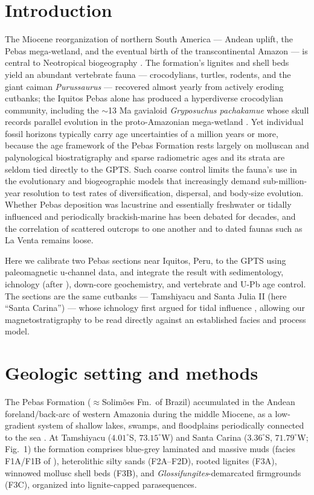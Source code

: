\documentclass[12pt]{article}
\begin{document}
\section*{Introduction}
The Miocene reorganization of northern South America --- Andean uplift, the Pebas
mega-wetland, and the eventual birth of the transcontinental Amazon --- is central to
Neotropical biogeography \citep{Hoorn2010,Wesselingh2006}. The formation's lignites and
shell beds yield an abundant vertebrate fauna --- crocodylians, turtles, rodents, and the
giant caiman \textit{Purussaurus} --- recovered almost yearly from actively eroding
cutbanks; the Iquitos Pebas alone has produced a hyperdiverse crocodylian community,
including the $\sim$13 Ma gavialoid \textit{Gryposuchus pachakamue} whose skull records
parallel evolution in the proto-Amazonian mega-wetland \citep{SalasGismondi2015,SalasGismondi2016}.
Yet individual fossil horizons typically carry age uncertainties of a million years or more,
because the age framework of the Pebas Formation rests largely on molluscan and palynological
biostratigraphy and sparse radiometric ages and its strata are seldom tied directly to the
GPTS. Such coarse control limits the fauna's use in the evolutionary and biogeographic
models that increasingly demand sub-million-year resolution to test rates of
diversification, dispersal, and body-size evolution. Whether Pebas deposition was
lacustrine and essentially freshwater \citep{Wesselingh2006} or tidally influenced and
periodically brackish-marine \citep{Rasanen1995,Gingras2002} has been debated for decades,
and the correlation of scattered outcrops to one another and to dated faunas such as La
Venta remains loose.

Here we calibrate two Pebas sections near Iquitos, Peru, to the GPTS using paleomagnetic
u-channel data, and integrate the result with sedimentology, ichnology (after
\citealp{Gingras2002}), down-core geochemistry, and vertebrate and U-Pb age control. The
sections are the same cutbanks --- Tamshiyacu and Santa Julia II (here ``Santa Carina'') ---
whose ichnology first argued for tidal influence \citep{Gingras2002}, allowing our
magnetostratigraphy to be read directly against an established facies and process model.

\section*{Geologic setting and methods}
The Pebas Formation ($\approx$Solim\~oes Fm.\ of Brazil) accumulated in the Andean
foreland/back-arc of western Amazonia during the middle Miocene, as a low-gradient system
of shallow lakes, swamps, and floodplains periodically connected to the sea
\citep{Hoorn1993,Hoorn2010,Hoorn2010ch}. At Tamshiyacu ($4.01^\circ$S, $73.15^\circ$W) and Santa Carina
($3.36^\circ$S, $71.79^\circ$W; Fig.~1) the formation comprises blue-grey laminated and
massive muds (facies F1A/F1B of \citealp{Gingras2002}), heterolithic silty sands
(F2A--F2D), rooted lignites (F3A), winnowed mollusc shell beds (F3B), and
\textit{Glossifungites}-demarcated firmgrounds (F3C), organized into lignite-capped
parasequences.
\end{document}

